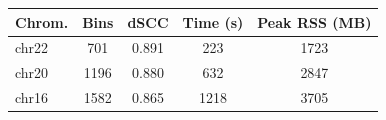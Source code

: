 \renewcommand{\arraystretch}{1.2}
\begin{tabular}{@{}lcccc@{}}
\toprule
\textbf{Chrom.} & \textbf{Bins} & \textbf{dSCC} & \textbf{Time (s)} & \textbf{Peak RSS (MB)} \\
\midrule
chr22 & 701 & 0.891 & 223 & 1723 \\
chr20 & 1196 & 0.880 & 632 & 2847 \\
chr16 & 1582 & 0.865 & 1218 & 3705 \\
\bottomrule
\end{tabular}
